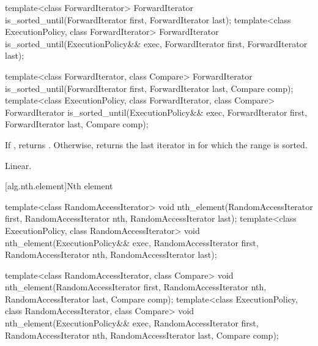 %
\begin{itemdecl}
template<class ForwardIterator>
  ForwardIterator is_sorted_until(ForwardIterator first, ForwardIterator last);
template<class ExecutionPolicy, class ForwardIterator>
  ForwardIterator is_sorted_until(ExecutionPolicy&& exec,
                                  ForwardIterator first, ForwardIterator last);

template<class ForwardIterator, class Compare>
  ForwardIterator is_sorted_until(ForwardIterator first, ForwardIterator last,
                                  Compare comp);
template<class ExecutionPolicy, class ForwardIterator, class Compare>
  ForwardIterator is_sorted_until(ExecutionPolicy&& exec,
                                  ForwardIterator first, ForwardIterator last,
                                  Compare comp);
\end{itemdecl}


\begin{itemdescr}
\pnum
\returns If , returns
. Otherwise, returns
the last iterator  in  for which the
range  is sorted.

\pnum
\complexity Linear.
\end{itemdescr}

[alg.nth.element]{Nth element}

%
\begin{itemdecl}
template<class RandomAccessIterator>
  void nth_element(RandomAccessIterator first, RandomAccessIterator nth,
                   RandomAccessIterator last);
template<class ExecutionPolicy, class RandomAccessIterator>
  void nth_element(ExecutionPolicy&& exec,
                   RandomAccessIterator first, RandomAccessIterator nth,
                   RandomAccessIterator last);

template<class RandomAccessIterator, class Compare>
  void nth_element(RandomAccessIterator first, RandomAccessIterator nth,
                   RandomAccessIterator last,  Compare comp);
template<class ExecutionPolicy, class RandomAccessIterator, class Compare>
  void nth_element(ExecutionPolicy&& exec,
                   RandomAccessIterator first, RandomAccessIterator nth,
                   RandomAccessIterator last, Compare comp);
\end{itemdecl}

